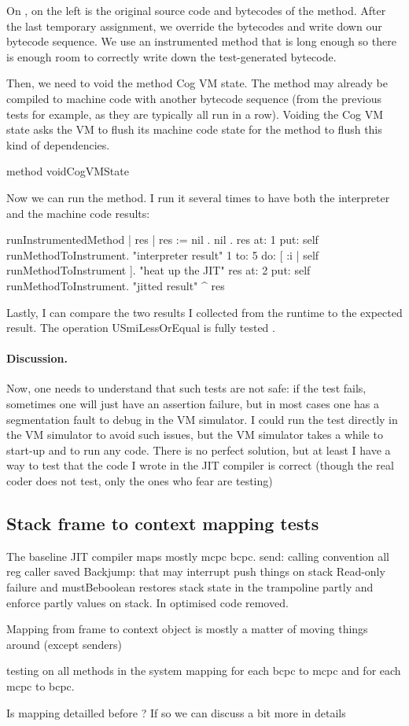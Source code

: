 \documentclass[a4paper,12pt,twoside]{../includes/ThesisStyle}
\begin{document}
On , on the left is the original source code and bytecodes of the method. After the last temporary assignment, we override the bytecodes and write down our bytecode sequence. We use an instrumented method that is long enough so there is enough room to correctly write down the test-generated bytecode.

Then, we need to void the method Cog VM state. The method may already be compiled to machine code with another bytecode sequence (from the previous tests for example, as they are typically all run in a row). Voiding the Cog VM state asks the VM to flush its machine code state for the method to flush this kind of dependencies.

method voidCogVMState

Now we can run the method. I run it several times to have both the interpreter and the machine code results:

\begin{code}
runInstrumentedMethod
| res |
res := { nil . nil }.
res at: 1 put: self runMethodToInstrument. "interpreter result"
1 to: 5 do: [ :i | self runMethodToInstrument ]. "heat up the JIT"
res at: 2 put: self runMethodToInstrument. "jitted result"
^ res
\end{code}

Lastly, I can compare the two results I collected from the runtime to the expected result. The operation USmiLessOrEqual is fully tested .

\paragraph{Discussion.} Now, one needs to understand that such tests are not safe: if the test fails, sometimes one will just have an assertion failure, but in most cases one has a segmentation fault to debug in the VM simulator. I could run the test directly in the VM simulator to avoid such issues, but the VM simulator takes a while to start-up and to run any code. There is no perfect solution, but at least I have a way to test that the code I wrote in the JIT compiler is correct (though the real coder does not test, only the ones who fear are testing)

\subsection{Stack frame to context mapping tests}

The baseline JIT compiler maps mostly mcpc bcpc.
send: calling convention all reg caller saved
Backjump: that may interrupt push things on stack
Read-only failure and mustBeboolean restores stack state in the trampoline partly and enforce partly values on stack. In optimised code removed.

Mapping from frame to context object is mostly a matter of moving things around (except senders)

testing on all methods in the system mapping for each bcpc to mcpc and for each mcpc to bcpc.

Is mapping detailled before ? If so we can discuss a bit more in details

\ifx\wholebook\relax\else
    
\end{document}
